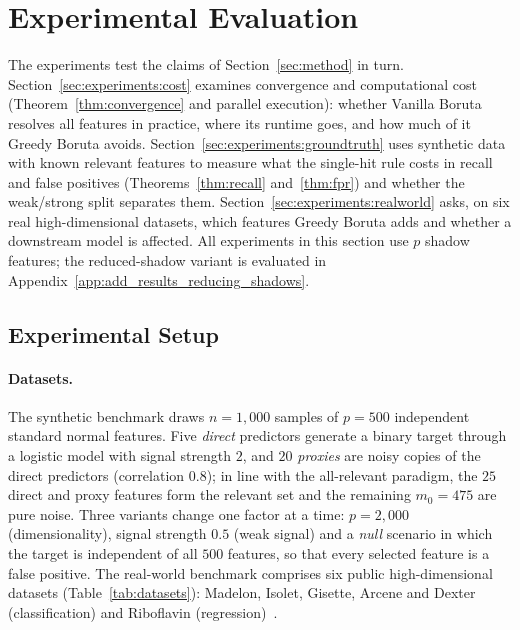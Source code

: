 \documentclass[runningheads]{llncs}
\begin{document}
\section{Experimental Evaluation}
\label{sec:experiments}

The experiments test the claims of Section~\ref{sec:method} in turn. Section~\ref{sec:experiments:cost} examines convergence and computational cost (Theorem~\ref{thm:convergence} and parallel execution): whether Vanilla Boruta resolves all features in practice, where its runtime goes, and how much of it Greedy Boruta avoids. Section~\ref{sec:experiments:groundtruth} uses synthetic data with known relevant features to measure what the single-hit rule costs in recall and false positives (Theorems~\ref{thm:recall} and~\ref{thm:fpr}) and whether the weak/strong split separates them. Section~\ref{sec:experiments:realworld} asks, on six real high-dimensional datasets, which features Greedy Boruta adds and whether a downstream model is affected. All experiments in this section use $p$ shadow features; the reduced-shadow variant is evaluated in Appendix~\ref{app:add_results_reducing_shadows}.


\subsection{Experimental Setup}
\label{sec:experiments:setup}

\paragraph{Datasets.} The synthetic benchmark draws $n=1{,}000$ samples of $p=500$ independent standard normal features. Five \emph{direct} predictors generate a binary target through a logistic model with signal strength $2$, and $20$ \emph{proxies} are noisy copies of the direct predictors (correlation $0.8$); in line with the all-relevant paradigm, the $25$ direct and proxy features form the relevant set and the remaining $m_0=475$ are pure noise. Three variants change one factor at a time: $p=2{,}000$ (dimensionality), signal strength $0.5$ (weak signal) and a \emph{null} scenario in which the target is independent of all $500$ features, so that every selected feature is a false positive. The real-world benchmark comprises six public high-dimensional datasets (Table~\ref{tab:datasets}): Madelon, Isolet, Gisette, Arcene and Dexter (classification) and Riboflavin (regression)~\cite{guyon2004result,uci2017,buhlmann2014hdi}.
\end{document}
